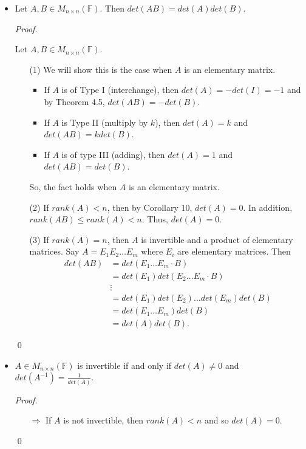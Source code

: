 \documentclass[12pt]{article}
\newenvironment{sol}
    {\emph{Proof.}
    }
    {
    \qed
    }
\begin{document}
\begin{itemize}
    \item Let $A, B \in M_{n \times n}(\mathbb{F})$. Then $det(AB) = det(A)det(B)$. 
    
    \begin{sol}
    Let $A, B \in M_{n \times n}(\mathbb{F})$. \begin{itemize}
        \item[(1)] We will show this is the case when $A$ is an elementary matrix. \begin{itemize}
            \item If $A$ is of Type I (interchange), then $det(A) = - det(I) = -1$ and by Theorem 4.5, $det(AB) = - det(B)$. 
            \item If $A$ is Type II (multiply by $k$), then $det(A) = k$ and $det(AB) = kdet(B)$.
            \item If $A$ is of type III (adding), then $det(A) = 1$ and $det(AB) = det(B)$.
        \end{itemize}
        So, the fact holds when $A$ is an elementary matrix.
        
        \item[(2)] If $rank(A) < n$, then by Corollary 10, $det(A) = 0$. In addition, $rank(AB) \leq rank(A) < n$. Thus, $det(A) = 0$.
        
        \item[(3)] If $rank(A) = n$, then $A$ is invertible and a product of elementary matrices. Say $A = E_1 E_2 \dots E_m$ where $E_i$ are elementary matrices. Then \begin{align*}
            det(AB) &= det(E_1 \dots E_m \cdot B) \\
            &= det(E_1) det(E_2  \dots  E_m \cdot B) \\
            &\vdots \\
            &= det(E_1)det(E_2)\dots det(E_m)det(B) \\
            &= det(E_1 \dots E_m)det(B) \\
            &= det(A)det(B).
        \end{align*} 
    \end{itemize}
    \end{sol}
    
    \item $A \in M_{n \times n}(\mathbb{F})$ is invertible if and only if $det(A) \neq 0$ and $det(A^{-1}) = \frac{1}{det(A)}$.
    
    \begin{sol}
    \begin{itemize}
        \item[$\Longrightarrow$] If $A$ is not invertible, then $rank(A) < n$ and so $det(A) = 0$.
        

\end{itemize}
\end{sol}
\end{itemize}
\end{document}
